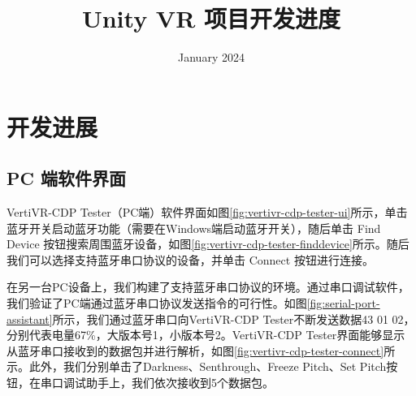 \documentclass[a4paper,10pt]{article}
\begin{document}
	
	
	\title{\songti {}Unity VR 项目开发进度}
	\date{\textrm{January 2024}}
	\maketitle
	
	\renewcommand{\figurename}{图} %
	\renewcommand{\contentsname}{目录}
	\renewcommand{\tablename}{表}
	\tableofcontents  %
		
	\section{开发进展}

		\subsection{PC 端软件界面}	
		
		VertiVR-CDP Tester（PC端）软件界面如图\ref{fig:vertivr-cdp-tester-ui}所示，单击蓝牙开关启动蓝牙功能（需要在Windows端启动蓝牙开关），随后单击 Find Device 按钮搜索周围蓝牙设备，如图\ref{fig:vertivr-cdp-tester-finddevice}所示。随后我们可以选择支持蓝牙串口协议的设备，并单击 Connect 按钮进行连接。
		
		在另一台PC设备上，我们构建了支持蓝牙串口协议的环境。通过串口调试软件，我们验证了PC端通过蓝牙串口协议发送指令的可行性。如图\ref{fig:serial-port-assistant}所示，我们通过蓝牙串口向VertiVR-CDP Tester不断发送数据43 01 02，分别代表电量67\%，大版本号1，小版本号2。VertiVR-CDP Tester界面能够显示从蓝牙串口接收到的数据包并进行解析，如图\ref{fig:vertivr-cdp-tester-connect}所示。此外，我们分别单击了Darkness、Senthrough、Freeze Pitch、Set Pitch按钮，在串口调试助手上，我们依次接收到5个数据包。
		
\end{document}
